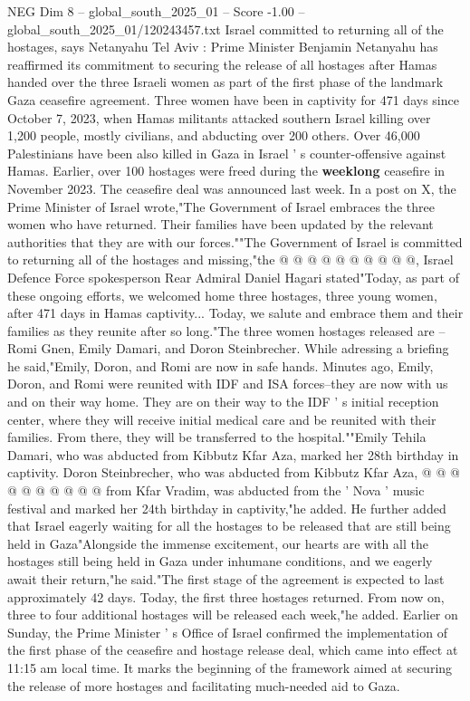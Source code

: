 \begin{textsample}{NEG Dim 8 – global\_south\_2025\_01 – Score -1.00 – global\_south\_2025\_01/120243457.txt}  \label{ex:f8_neg_335}
Israel committed to returning all of the hostages, says Netanyahu Tel Aviv : Prime Minister Benjamin Netanyahu has reaffirmed its commitment to securing the release of all hostages after Hamas handed over the three Israeli women as part of the first phase of the landmark Gaza ceasefire agreement.
Three women have been in captivity for 471 days since October 7, 2023, when Hamas militants attacked southern Israel killing over 1,200 people, mostly civilians, and abducting over 200 others.
Over 46,000 Palestinians have been also killed in Gaza in Israel ' s counter-offensive against Hamas.
Earlier, over 100 hostages were freed during the \textbf{weeklong} ceasefire in November 2023.
The ceasefire deal was announced last week.
In a post on X, the Prime Minister of Israel wrote,"The Government of Israel embraces the three women who have returned.
Their families have been updated by the relevant authorities that they are with our forces.""The Government of Israel is committed to returning all of the hostages and missing,"the @ @ @ @ @ @ @ @ @ @, Israel Defence Force spokesperson Rear Admiral Daniel Hagari stated"Today, as part of these ongoing efforts, we welcomed home three hostages, three young women, after 471 days in Hamas captivity...
Today, we salute and embrace them and their families as they reunite after so long."The three women hostages released are -- Romi Gnen, Emily Damari, and Doron Steinbrecher.
While adressing a briefing he said,"Emily, Doron, and Romi are now in safe hands.
Minutes ago, Emily, Doron, and Romi were reunited with IDF and ISA forces--they are now with us and on their way home.
They are on their way to the IDF ' s initial reception center, where they will receive initial medical care and be reunited with their families.
From there, they will be transferred to the hospital.""Emily Tehila Damari, who was abducted from Kibbutz Kfar Aza, marked her 28th birthday in captivity.
Doron Steinbrecher, who was abducted from Kibbutz Kfar Aza, @ @ @ @ @ @ @ @ @ @ from Kfar Vradim, was abducted from the ' Nova ' music festival and marked her 24th birthday in captivity,"he added.
He further added that Israel eagerly waiting for all the hostages to be released that are still being held in Gaza"Alongside the immense excitement, our hearts are with all the hostages still being held in Gaza under inhumane conditions, and we eagerly await their return,"he said."The first stage of the agreement is expected to last approximately 42 days.
Today, the first three hostages returned.
From now on, three to four additional hostages will be released each week,"he added.
Earlier on Sunday, the Prime Minister ' s Office of Israel confirmed the implementation of the first phase of the ceasefire and hostage release deal, which came into effect at 11:15 am local time.
It marks the beginning of the framework aimed at securing the release of more hostages and facilitating much-needed aid to Gaza.

\end{textsample}
